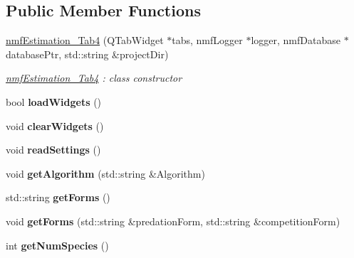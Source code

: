 \subsection*{Public Member Functions}
\begin{DoxyCompactItemize}
\item 
\hyperlink{classnmf_estimation___tab4_aeb1d5dc876d4a5f4d8c032734a40c72a}{nmf\+Estimation\+\_\+\+Tab4} (Q\+Tab\+Widget $\ast$tabs, nmf\+Logger $\ast$logger, nmf\+Database $\ast$database\+Ptr, std\+::string \&project\+Dir)
\begin{DoxyCompactList}\small\item\em \hyperlink{classnmf_estimation___tab4}{nmf\+Estimation\+\_\+\+Tab4} \+: class constructor \end{DoxyCompactList}\item 
bool {\bfseries load\+Widgets} ()\hypertarget{classnmf_estimation___tab4_a4b9929b6e8eb8c55cb89f3491c2b9d0d}{}\label{classnmf_estimation___tab4_a4b9929b6e8eb8c55cb89f3491c2b9d0d}

\item 
void {\bfseries clear\+Widgets} ()\hypertarget{classnmf_estimation___tab4_acebcaad1dbb53f38e21e39d0d6b78c8c}{}\label{classnmf_estimation___tab4_acebcaad1dbb53f38e21e39d0d6b78c8c}

\item 
void {\bfseries read\+Settings} ()\hypertarget{classnmf_estimation___tab4_a2fc3493906aa57d58ecc88a5129dc4b3}{}\label{classnmf_estimation___tab4_a2fc3493906aa57d58ecc88a5129dc4b3}

\item 
void {\bfseries get\+Algorithm} (std\+::string \&Algorithm)\hypertarget{classnmf_estimation___tab4_a83f50b27d4b65a0781e058cf2fa1becc}{}\label{classnmf_estimation___tab4_a83f50b27d4b65a0781e058cf2fa1becc}

\item 
std\+::string {\bfseries get\+Forms} ()\hypertarget{classnmf_estimation___tab4_ae87178bbd83dee3d222e96745d1fb724}{}\label{classnmf_estimation___tab4_ae87178bbd83dee3d222e96745d1fb724}

\item 
void {\bfseries get\+Forms} (std\+::string \&predation\+Form, std\+::string \&competition\+Form)\hypertarget{classnmf_estimation___tab4_ab90019ed06e170b2fd80417511746305}{}\label{classnmf_estimation___tab4_ab90019ed06e170b2fd80417511746305}

\item 
int {\bfseries get\+Num\+Species} ()\hypertarget{classnmf_estimation___tab4_aff355b67cb6d89bc9c312fb1f5d0c062}{}\label{classnmf_estimation___tab4_aff355b67cb6d89bc9c312fb1f5d0c062}

\end{DoxyCompactItemize}


